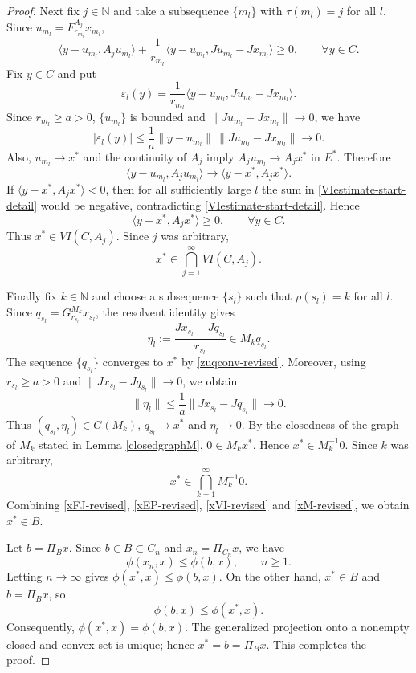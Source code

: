 \documentclass[leqno,12pt]{amsart}
\theoremstyle{definition}
\numberwithin{equation}{section}
\begin{document}
\begin{proof}
Next fix $j\in\mathbb N$ and take a subsequence $\{m_l\}$ with $\tau(m_l)=j$ for all $l$. Since $u_{m_l}=F_{r_{m_l}}^{A_j}x_{m_l}$,
\begin{equation}\label{VIestimate-start-detail}
\langle y-u_{m_l},A_ju_{m_l}\rangle+
\frac{1}{r_{m_l}}\langle y-u_{m_l},Ju_{m_l}-Jx_{m_l}\rangle\geq0,
\qquad \forall y\in C.
\end{equation}
Fix $y\in C$ and put
\[
\varepsilon_l(y)=\frac{1}{r_{m_l}}\langle y-u_{m_l},Ju_{m_l}-Jx_{m_l}\rangle.
\]
Since $r_{m_l}\geq a>0$, $\{u_{m_l}\}$ is bounded and $\|Ju_{m_l}-Jx_{m_l}\|\to0$, we have
\[
|\varepsilon_l(y)|\leq \frac{1}{a}\|y-u_{m_l}\|\,\|Ju_{m_l}-Jx_{m_l}\|\to0.
\]
Also, $u_{m_l}\to x^{*}$ and the continuity of $A_j$ imply $A_ju_{m_l}\to A_jx^{*}$ in $E^{*}$. Therefore
\[
\langle y-u_{m_l},A_ju_{m_l}\rangle\to \langle y-x^{*},A_jx^{*}\rangle.
\]
If $\langle y-x^{*},A_jx^{*}\rangle<0$, then for all sufficiently large $l$ the sum in \eqref{VIestimate-start-detail} would be negative, contradicting \eqref{VIestimate-start-detail}. Hence
\[
\langle y-x^{*},A_jx^{*}\rangle\geq0,
\qquad \forall y\in C.
\]
Thus $x^{*}\in VI(C,A_j)$. Since $j$ was arbitrary,
\begin{equation}\label{xVI-revised}
x^{*}\in\bigcap_{j=1}^{\infty}VI(C,A_j).
\end{equation}

Finally fix $k\in\mathbb N$ and choose a subsequence $\{s_l\}$ such that $\rho(s_l)=k$ for all $l$. Since $q_{s_l}=G_{r_{s_l}}^{M_k}x_{s_l}$, the resolvent identity gives
\[
\eta_l:=\frac{Jx_{s_l}-Jq_{s_l}}{r_{s_l}}\in M_kq_{s_l}.
\]
The sequence $\{q_{s_l}\}$ converges to $x^{*}$ by \eqref{zuqconv-revised}. Moreover, using $r_{s_l}\geq a>0$ and $\|Jx_{s_l}-Jq_{s_l}\|\to0$, we obtain
\[
\|\eta_l\|\leq \frac{1}{a}\|Jx_{s_l}-Jq_{s_l}\|\to0.
\]
Thus $(q_{s_l},\eta_l)\in G(M_k)$, $q_{s_l}\to x^{*}$ and $\eta_l\to0$. By the closedness of the graph of $M_k$ stated in Lemma \ref{closedgraphM}, $0\in M_kx^{*}$. Hence $x^{*}\in M_k^{-1}0$. Since $k$ was arbitrary,
\begin{equation}\label{xM-revised}
x^{*}\in\bigcap_{k=1}^{\infty}M_k^{-1}0.
\end{equation}
Combining \eqref{xFJ-revised}, \eqref{xEP-revised}, \eqref{xVI-revised} and \eqref{xM-revised}, we obtain $x^{*}\in B$.

Let $b=\Pi_Bx$. Since $b\in B\subset C_n$ and $x_n=\Pi_{C_n}x$, we have
\[
\phi(x_n,x)\leq \phi(b,x),\qquad n\geq1.
\]
Letting $n\to\infty$ gives $\phi(x^{*},x)\leq\phi(b,x)$. On the other hand, $x^{*}\in B$ and $b=\Pi_Bx$, so
\[
\phi(b,x)\leq \phi(x^{*},x).
\]
Consequently, $\phi(x^{*},x)=\phi(b,x)$. The generalized projection onto a nonempty closed and convex set is unique; hence $x^{*}=b=\Pi_Bx$. This completes the proof.
\end{proof}
\end{document}
